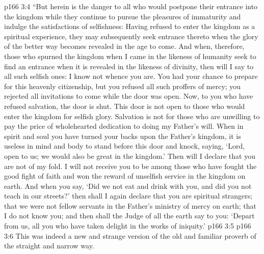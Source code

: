 \vs p166 3:4 “But herein is the danger to all who would postpone their entrance into the kingdom while they continue to pursue the pleasures of immaturity and indulge the satisfactions of selfishness: Having refused to enter the kingdom as a spiritual experience, they may subsequently seek entrance thereto when the glory of the better way becomes revealed in the age to come. And when, therefore, those who spurned the kingdom when I came in the likeness of humanity seek to find an entrance when it is revealed in the likeness of divinity, then will I say to all such selfish ones: I know not whence you are. You had your chance to prepare for this heavenly citizenship, but you refused all such proffers of mercy; you rejected all invitations to come while the door was open. Now, to you who have refused salvation, the door is shut. This door is not open to those who would enter the kingdom for selfish glory. Salvation is not for those who are unwilling to pay the price of wholehearted dedication to doing my Father’s will. When in spirit and soul you have turned your backs upon the Father’s kingdom, it is useless in mind and body to stand before this door and knock, saying, ‘Lord, open to us; we would also be great in the kingdom.’ Then will I declare that you are not of my fold. I will not receive you to be among those who have fought the good fight of faith and won the reward of unselfish service in the kingdom on earth. And when you say, ‘Did we not eat and drink with you, and did you not teach in our streets?’ then shall I again declare that you are spiritual strangers; that we were not fellow servants in the Father’s ministry of mercy on earth; that I do not know you; and then shall the Judge of all the earth say to you: ‘Depart from us, all you who have taken delight in the works of iniquity.’
\vs p166 3:5 
\vs p166 3:6 This was indeed a new and strange version of the old and familiar proverb of the straight and narrow way.
